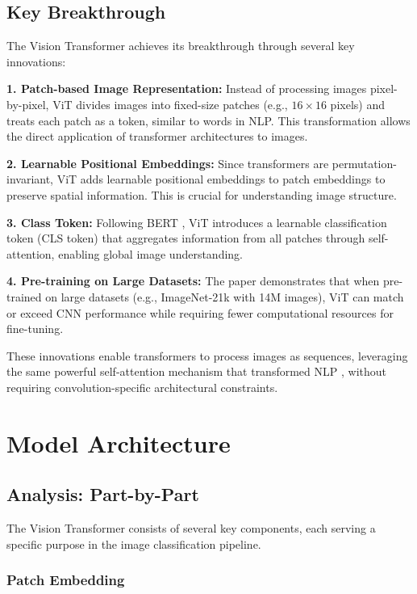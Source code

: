 \documentclass{article}
\begin{document}
\subsection{Key Breakthrough}

The Vision Transformer achieves its breakthrough through several key innovations:

\textbf{1. Patch-based Image Representation:} Instead of processing images pixel-by-pixel, ViT divides images into fixed-size patches (e.g., $16 \times 16$ pixels) and treats each patch as a token, similar to words in NLP. This transformation allows the direct application of transformer architectures to images.

\textbf{2. Learnable Positional Embeddings:} Since transformers are permutation-invariant, ViT adds learnable positional embeddings to patch embeddings to preserve spatial information. This is crucial for understanding image structure.

\textbf{3. Class Token:} Following BERT \citep{devlin2018bert}, ViT introduces a learnable classification token (CLS token) that aggregates information from all patches through self-attention, enabling global image understanding.

\textbf{4. Pre-training on Large Datasets:} The paper demonstrates that when pre-trained on large datasets (e.g., ImageNet-21k with 14M images), ViT can match or exceed CNN performance while requiring fewer computational resources for fine-tuning.

These innovations enable transformers to process images as sequences, leveraging the same powerful self-attention mechanism that transformed NLP \citep{vaswani2017attention}, without requiring convolution-specific architectural constraints.

\section{Model Architecture}

\subsection{Analysis: Part-by-Part}

The Vision Transformer consists of several key components, each serving a specific purpose in the image classification pipeline.

\subsubsection{Patch Embedding}
\end{document}
